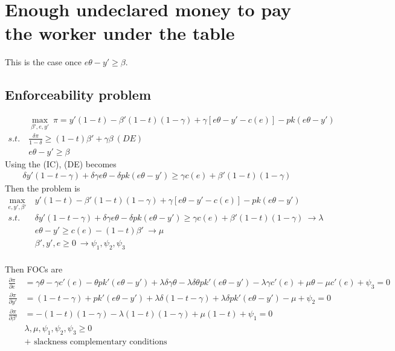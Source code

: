 \documentclass[a4paper]{article}
\begin{document}
\section{Enough undeclared money to pay the worker under the table}
This is the case once $e\theta - y' \ge \beta$.
\subsection{Enforceability problem}
\begin{align*}
&\underset{\beta', e, y'}{\max}\ \pi = y'(1 - t) - \beta'(1-t)(1 - \gamma) + \gamma[e\theta - y' - c(e)] - pk(e\theta - y')\\
s.t.\ &\frac{\delta \pi}{1 - \delta} \ge (1-t)\beta' + \gamma \beta\ (DE) \\
&e\theta - y' \ge \beta
\end{align*}
Using the (IC), (DE) becomes
\begin{align*}
\delta y'(1 - t - \gamma) + \delta \gamma e \theta - \delta p k(e \theta - y') \ge \gamma c(e) + \beta'(1-t)(1 - \gamma)
\end{align*}
Then the problem is
\begin{align*}
\underset{e, y', \beta'}{\max}\ &y'(1 - t) - \beta'(1-t)(1 - \gamma) + \gamma[e\theta - y' - c(e)] - pk(e\theta - y')\\
s.t.\ &\delta y'(1 - t - \gamma) + \delta \gamma e \theta - \delta p k(e \theta - y') \ge \gamma c(e) + \beta'(1-t)(1 - \gamma)\ \to \lambda \\
& e\theta - y' \ge c(e) - (1 - t)\beta'\ \to \mu \\
& \beta', y', e \ge 0\ \to \psi_1, \psi_2, \psi_3\ \\
\end{align*}

Then FOCs are 
\begin{align}
\frac{\partial \pi}{\partial e} &= \gamma \theta - \gamma c'(e)- \theta p k'(e \theta - y') + \lambda \delta \gamma \theta - \lambda \delta \theta pk'(e \theta - y') - \lambda \gamma c'(e) + \mu \theta - \mu c'(e) + \psi_3= 0\label{eq1}\\
\frac{\partial \pi}{\partial y'} &= (1 - t - \gamma)+pk'(e\theta - y') + \lambda \delta (1 - t - \gamma) +\lambda \delta pk'(e\theta - y') - \mu + \psi_2 = 0\label{eq2}\\
\frac{\partial \pi}{\partial \beta'} &= -(1-t)(1-\gamma) - \lambda (1-t)(1-\gamma) + \mu(1 - t) + \psi_1= 0\label{eq3}\\
&\lambda, \mu, \psi_1, \psi_2, \psi_3 \ge 0\nonumber\\
&+\text{ slackness complementary conditions}\nonumber
\end{align}
\end{document}
